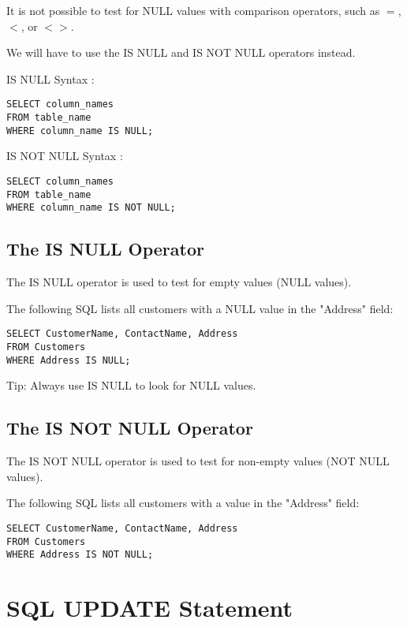 \documentclass[a4paper,12pt]{article}
\begin{document}
It is not possible to test for NULL values with comparison operators, such as $=$, $<$, or $<>$.

We will have to use the IS NULL and IS NOT NULL operators instead.

IS NULL Syntax :

\begin{lstlisting}
SELECT column_names
FROM table_name
WHERE column_name IS NULL;
\end{lstlisting}

IS NOT NULL Syntax :

\begin{lstlisting}
SELECT column_names
FROM table_name
WHERE column_name IS NOT NULL;
\end{lstlisting}

\subsection{The IS NULL Operator}

The IS NULL operator is used to test for empty values (NULL values).

The following SQL lists all customers with a NULL value in the "Address" field:


\begin{lstlisting}
SELECT CustomerName, ContactName, Address
FROM Customers
WHERE Address IS NULL;
\end{lstlisting}


Tip: Always use IS NULL to look for NULL values.


\subsection{The IS NOT NULL Operator}

The IS NOT NULL operator is used to test for non-empty values (NOT NULL values).

The following SQL lists all customers with a value in the "Address" field:


\begin{lstlisting}
SELECT CustomerName, ContactName, Address
FROM Customers
WHERE Address IS NOT NULL;
\end{lstlisting}


\section{SQL UPDATE Statement}
\end{document}
